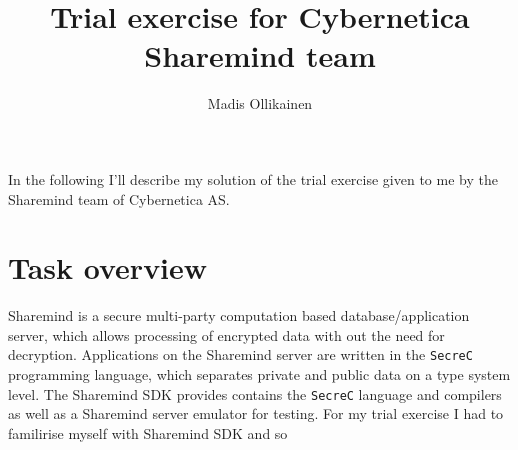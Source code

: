 \documentclass[11pt]{article}
\author{Madis Ollikainen}
\title{Trial exercise for Cybernetica Sharemind team}
\newcommand{\ct}[1]{\texttt{#1}}
\begin{document}
\maketitle

In the following I'll describe my solution of the trial exercise given to me by the Sharemind team of Cybernetica AS.

\section{Task overview} %
\label{sec:task_overview}

Sharemind is a secure multi-party computation based database/application server, which allows processing of encrypted data with out the need for decryption. Applications on the Sharemind server are written in the \ct{SecreC} programming language, which separates private and public data on a type system level. The Sharemind SDK provides contains the \ct{SecreC} language and compilers as well as a Sharemind server emulator for testing. For my trial exercise I had to familirise myself with Sharemind SDK and so     




% 
\end{document}
